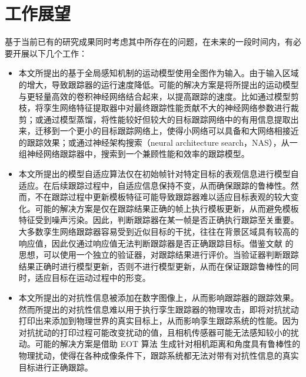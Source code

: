 \section{工作展望}
基于当前已有的研究成果同时考虑其中所存在的问题，在未来的一段时间内，有必要开展以下几个工作：
\begin{itemize}
\item 本文所提出的基于全局感知机制的运动模型使用全图作为输入。由于输入区域的增大，导致跟踪器的运行速度降低。可能的解决方案是将所提出的运动模型与更轻量高效的卷积神经网络结合起来，以提高跟踪的速度。比如通过模型剪枝，将孪生网络特征提取器中对最终跟踪性能贡献不大的神经网络参数进行裁剪；或通过模型蒸馏，将性能较好但较大的目标跟踪网络中的有用信息提取出来，迁移到一个更小的目标跟踪网络上，使得小网络可以具备和大网络相接近的跟踪效果；或通过神经架构搜索（neural architecture search，NAS），从一组神经网络跟踪器中，搜索到一个兼顾性能和效率的跟踪模型。
\item 本文所提出的模型自适应算法仅在初始帧针对特定目标的表观信息进行模型自适应。在后续跟踪过程中，自适应信息保持不变，从而确保跟踪的鲁棒性。然而，不在跟踪过程中更新模板特征可能导致跟踪器难以适应目标表观的较大变化。可能的解决方案是仅在跟踪结果正确的帧上执行模板更新，从而避免模板特征受到噪声污染。因此，判断跟踪器在某一帧是否正确执行跟踪至关重要。大多数孪生网络跟踪器容易受到近似目标的干扰，往往在背景区域具有较高的响应值，因此仅通过响应值无法判断跟踪器是否正确跟踪目标。借鉴文献 \cite{fan2018parallel} 的思想，可以使用一个独立的验证器，对跟踪结果进行评价。当验证器判断跟踪结果正确时进行模型更新，否则不进行模型更新，从而在保证跟踪鲁棒性的同时，适应目标在运动过程中的形变。
\item 本文所提出的对抗性信息被添加在数字图像上，从而影响跟踪器的跟踪效果。然而所提出的对抗性信息难以用于执行孪生跟踪器的物理攻击，即将对抗扰动打印出来添加到物理世界的真实目标上，从而影响孪生跟踪系统的性能。因为对抗扰动的打印过程可能改变扰动的值，且相机传感器可能无法感知较小的扰动。可能的解决方案是借助 EOT 算法 \cite{athalye2018synthesizing} 生成针对相机距离和角度具有鲁棒性的物理扰动，使得在各种成像条件下，跟踪系统都无法对带有对抗性信息的真实目标进行正确跟踪。
\end{itemize}